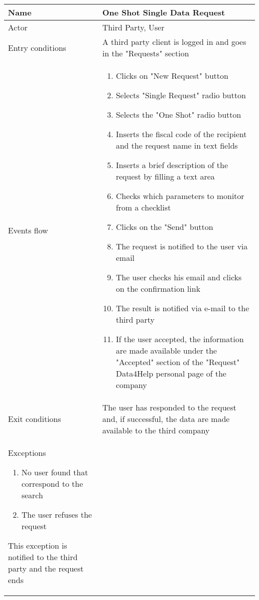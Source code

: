 \begin{table}[h!]
\begin{tabular}{|l|p{12cm}|}
\hline
Name             & One Shot Single Data Request \\ \hline
Actor            & Third Party, User \\ \hline
Entry conditions & A third party client is logged in and goes in the "Requests" section\\ \hline
Events flow      & \begin{enumerate}
\item Clicks on "New Request" button
\item Selects "Single Request" radio button
\item Selects the "One Shot" radio button
\item Inserts the fiscal code of the recipient and the request name in text fields
\item Inserts a brief description of the request by filling a text area
\item Checks which parameters to monitor from a checklist
\item Clicks on the "Send" button
\item The request is notified to the user via email
\item The user checks his email and clicks on the confirmation link
\item The result is notified via e-mail to the third party
\item If the user accepted, the information are made available under the "Accepted" section of the "Request" Data4Help personal page of the company
\end{enumerate} \\ \hline
Exit conditions  & The user has responded to the request and, if successful, the data are made available to the third company \\ \hline
Exceptions \begin{enumerate}
\item No user found that correspond to the search
\item The user refuses the request
\end{enumerate} This exception is notified to the third party and the request ends\\  \hline
\end{tabular}
\end{table}

